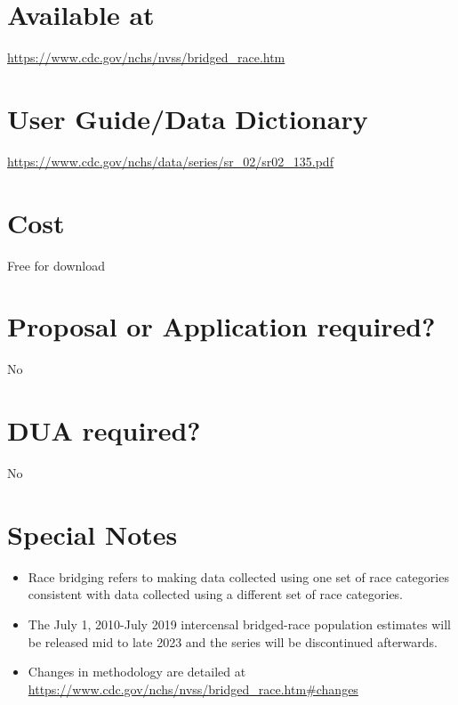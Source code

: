 \documentclass[
]{book}
\providecommand{\tightlist}{%
  \setlength{\itemsep}{0pt}\setlength{\parskip}{0pt}}
\begin{document}
\hypertarget{available-at-13}{%
\section{Available at}\label{available-at-13}}

\url{https://www.cdc.gov/nchs/nvss/bridged_race.htm}

\hypertarget{user-guidedata-dictionary-13}{%
\section{User Guide/Data Dictionary}\label{user-guidedata-dictionary-13}}

\url{https://www.cdc.gov/nchs/data/series/sr_02/sr02_135.pdf}

\hypertarget{cost-13}{%
\section{Cost}\label{cost-13}}

Free for download

\hypertarget{proposal-or-application-required-13}{%
\section{Proposal or Application required?}\label{proposal-or-application-required-13}}

No

\hypertarget{dua-required-13}{%
\section{DUA required?}\label{dua-required-13}}

No

\hypertarget{special-notes-13}{%
\section{Special Notes}\label{special-notes-13}}

\begin{itemize}
\tightlist
\item
  Race bridging refers to making data collected using one set of race categories consistent with data collected using a different set of race categories.
\item
  The July 1, 2010-July 2019 intercensal bridged-race population estimates will be released mid to late 2023 and the series will be discontinued afterwards.
\item
  Changes in methodology are detailed at \url{https://www.cdc.gov/nchs/nvss/bridged_race.htm\#changes}
\end{itemize}
\end{document}
